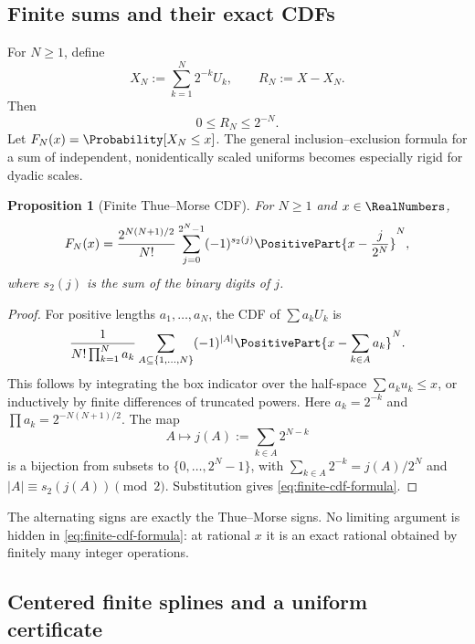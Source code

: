 \documentclass[11pt,oneside]{article}
\newtheorem{proposition}[theorem]{Proposition}
\theoremstyle{definition}
\theoremstyle{remark}
\numberwithin{equation}{section}
\begin{document}
\subsection{Finite sums and their exact CDFs}

For $N\ge1$, define
\begin{equation}\label{eq:finite-random-sum}
 X_N:=\sum_{k=1}^{N}2^{-k}U_k,
 \qquad
 R_N:=X-X_N.
\end{equation}
Then
\begin{equation}\label{eq:tail-bound}
 0\le R_N\le2^{-N}.
\end{equation}
Let $F_N(x)=\Probability[X_N\le x]$.  The general inclusion--exclusion formula for a
sum of independent, nonidentically scaled uniforms becomes especially rigid
for dyadic scales.

\begin{proposition}[Finite Thue--Morse CDF]\label{prop:finite-cdf}
For $N\ge1$ and $x\in\RealNumbers$,
\begin{equation}\label{eq:finite-cdf-formula}
 F_N(x)=
 \frac{2^{N(N+1)/2}}{N!}
 \sum_{j=0}^{2^N-1}(-1)^{s_2(j)}
 \PositivePart{x-\frac{j}{2^N}}^{N},
\end{equation}
where $s_2(j)$ is the sum of the binary digits of $j$.
\end{proposition}

\begin{proof}
For positive lengths $a_1,\ldots,a_N$, the CDF of
$\sum a_kU_k$ is
\[
 \frac{1}{N!\prod_{k=1}^N a_k}
 \sum_{A\subseteq\{1,\ldots,N\}}(-1)^{|A|}
 \PositivePart{x-\sum_{k\in A}a_k}^{N}.
\]
This follows by integrating the box indicator over the half-space
$\sum a_ku_k\le x$, or inductively by finite differences of truncated powers.
Here $a_k=2^{-k}$ and
$\prod a_k=2^{-N(N+1)/2}$.  The map
\[
 A\longmapsto j(A):=\sum_{k\in A}2^{N-k}
\]
is a bijection from subsets to $\{0,\ldots,2^N-1\}$, with
$\sum_{k\in A}2^{-k}=j(A)/2^N$ and
$|A|\equiv s_2(j(A))\pmod2$.  Substitution gives
\eqref{eq:finite-cdf-formula}.
\end{proof}

The alternating signs are exactly the Thue--Morse signs.  No limiting
argument is hidden in \eqref{eq:finite-cdf-formula}: at rational $x$ it is an
exact rational obtained by finitely many integer operations.

\subsection{Centered finite splines and a uniform certificate}
\end{document}
